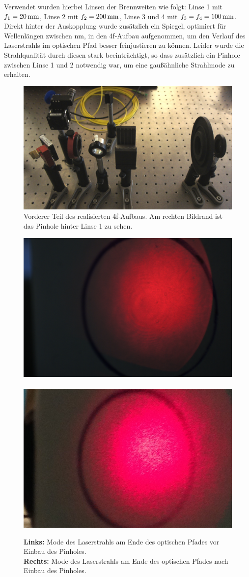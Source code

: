 Verwendet wurden hierbei Linsen der Brennweiten wie folgt: Linse 1 mit $f_{1}=\unit[20]{mm}$, Linse 2 mit $f_{2}=\unit[200]{mm}$, Linse 3 und 4 mit $f_{3}=f_{4}=\unit[100]{mm}$. Direkt hinter der Auskopplung wurde zusätzlich ein Spiegel, optimiert für Wellenlängen zwischen \unit[400-700]{nm}, in den 4f-Aufbau aufgenommen, um den Verlauf des Laserstrahls im optischen Pfad besser feinjustieren zu können. Leider wurde die Strahlqualität durch diesen stark beeinträchtigt, so dass zusätzlich ein Pinhole zwischen Linse 1 und 2 notwendig war, um eine gaußähnliche Strahlmode zu erhalten.\\


\begin{figure}[h]
	\centering
	\includegraphics[width=0.7\linewidth]{images/_DSC7961.JPG}
	\caption{
		Vorderer Teil des realisierten 4f-Aufbaus. Am rechten Bildrand ist das Pinhole hinter Linse 1 zu sehen.
	}
	\label{fig:_DSC7961}
\end{figure}

\begin{figure}
	\centering
	\includegraphics[width=0.45\linewidth]{images/_DSC7988.JPG}~
	\includegraphics[width=0.45\linewidth]{images/IMG_2223.jpg}
	\caption{
		\textbf{Links:} Mode des Laserstrahls am Ende des optischen Pfades vor Einbau des Pinholes.\\
		\textbf{Rechts:} Mode des Laserstrahls am Ende des optischen Pfades nach Einbau des Pinholes.
	}
	\label{fig:_DSC7988}
\end{figure}



